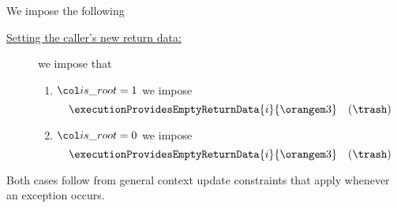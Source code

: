 \begin{center}
\end{center}
We impose the following
\begin{description}
	\item[\underline{Setting the caller's new return data:}]
		we impose that
		\begin{enumerate}
			\item \If $\locIsRoot = 1$ \Then we impose
				\[
					\executionProvidesEmptyReturnData
					{i}{\locCallerContextRowOffsetException}
					\quad (\trash)
				\]
			\item \If $\locIsRoot = 0$ \Then we impose
				\[
					\executionProvidesEmptyReturnData
					{i}{\locCallerContextRowOffsetException}
					\quad (\trash)
				\]
		\end{enumerate}
\end{description}
\saNote{}
Both cases follow from general context update constraints that apply whenever an exception occurs.
